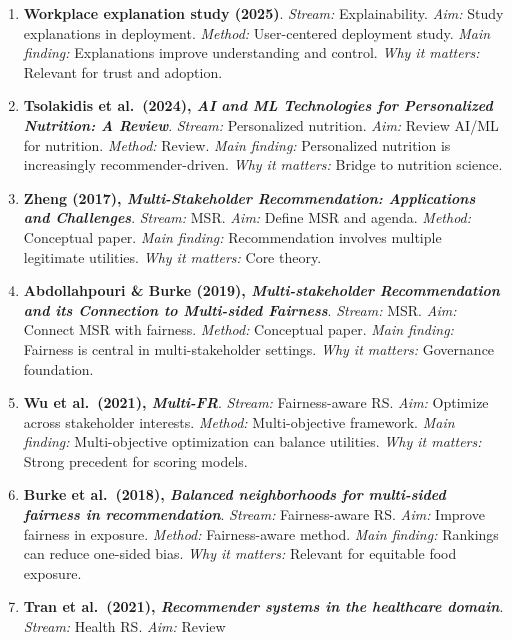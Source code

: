 \documentclass[journal]{IEEEtran}
\begin{document}
\begin{enumerate}
  Healthy food RS. \emph{Aim:} Improve recommendation accuracy.
  \emph{Method:} ML model. \emph{Main finding:} Richer
  user-food-ingredient modeling improves personalization. \emph{Why it
  matters:} Useful for technical engine design.
\item
  \textbf{Workplace explanation study (2025)}. \emph{Stream:}
  Explainability. \emph{Aim:} Study explanations in deployment.
  \emph{Method:} User-centered deployment study. \emph{Main finding:}
  Explanations improve understanding and control. \emph{Why it matters:}
  Relevant for trust and adoption.
\item
  \textbf{Tsolakidis et al.~(2024), \emph{AI and ML Technologies for
  Personalized Nutrition: A Review}}. \emph{Stream:} Personalized
  nutrition. \emph{Aim:} Review AI/ML for nutrition. \emph{Method:}
  Review. \emph{Main finding:} Personalized nutrition is increasingly
  recommender-driven. \emph{Why it matters:} Bridge to nutrition
  science.
\item
  \textbf{Zheng (2017), \emph{Multi-Stakeholder Recommendation:
  Applications and Challenges}}. \emph{Stream:} MSR. \emph{Aim:} Define
  MSR and agenda. \emph{Method:} Conceptual paper. \emph{Main finding:}
  Recommendation involves multiple legitimate utilities. \emph{Why it
  matters:} Core theory.
\item
  \textbf{Abdollahpouri \& Burke (2019), \emph{Multi-stakeholder
  Recommendation and its Connection to Multi-sided Fairness}}.
  \emph{Stream:} MSR. \emph{Aim:} Connect MSR with fairness.
  \emph{Method:} Conceptual paper. \emph{Main finding:} Fairness is
  central in multi-stakeholder settings. \emph{Why it matters:}
  Governance foundation.
\item
  \textbf{Wu et al.~(2021), \emph{Multi-FR}}. \emph{Stream:}
  Fairness-aware RS. \emph{Aim:} Optimize across stakeholder interests.
  \emph{Method:} Multi-objective framework. \emph{Main finding:}
  Multi-objective optimization can balance utilities. \emph{Why it
  matters:} Strong precedent for scoring models.
\item
  \textbf{Burke et al.~(2018), \emph{Balanced neighborhoods for
  multi-sided fairness in recommendation}}. \emph{Stream:}
  Fairness-aware RS. \emph{Aim:} Improve fairness in exposure.
  \emph{Method:} Fairness-aware method. \emph{Main finding:} Rankings
  can reduce one-sided bias. \emph{Why it matters:} Relevant for
  equitable food exposure.
\item
  \textbf{Tran et al.~(2021), \emph{Recommender systems in the
  healthcare domain}}. \emph{Stream:} Health RS. \emph{Aim:} Review

\end{enumerate}
\end{document}
